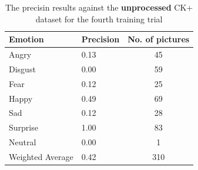 \documentclass[runningheads,a4paper,11pt]{report}
\begin{document}
\begin{table}[htbp]
	\caption{The precisin results against the \textbf{unprocessed} CK+ dataset for the fourth training trial}
	\label{fer_training_28k_001_mean_square_unprocessed_ckp}
		\begin{center}
			\begin{tabular}{p{110pt}p{110pt}c}
				\textbf{Emotion}& \textbf{Precision}& \textbf{No. of pictures} \\
				\hline\hline
				Angry& 0.13& 45 \\
				Disgust& 0.00& 59 \\
				Fear& 0.12& 25 \\
				Happy& 0.49& 69 \\
				Sad& 0.12& 28 \\
				Surprise& 1.00& 83 \\
				Neutral& 0.00& 1 \\
				\hline
				Weighted Average& 0.42& 310
			\end{tabular}
		\end{center}
\end{table}
\end{document}
